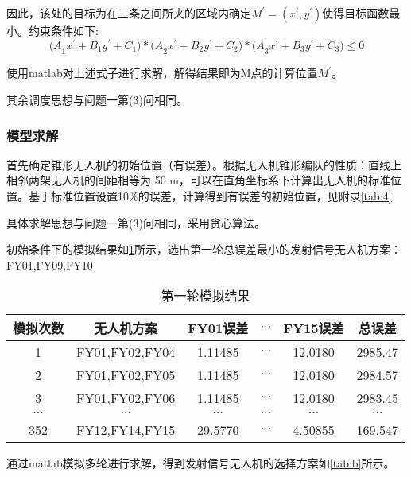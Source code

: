 \documentclass{cumcmthesis}
\begin{document}
因此，该处的目标为在三条之间所夹的区域内确定$M^\prime=(x^\prime,y^\prime)$使得目标函数最小。约束条件如下:
\begin{equation}
	{(A}_1x^\prime+B_1y^\prime+C_1)\ast{(A}_2x^\prime+B_2y^\prime+C_2)\ast{(A}_3x^\prime+B_3y^\prime+C_3)\le0
	\label{eq:34}
\end{equation}

使用matlab对上述式子进行求解，解得结果即为M点的计算位置$M^\prime$。

其余调度思想与问题一第(3)问相同。
\subsubsection{模型求解}

首先确定锥形无人机的初始位置（有误差）。根据无人机锥形编队的性质：直线上相邻两架无人机的间距相等为 50 m，可以在直角坐标系下计算出无人机的标准位置。基于标准位置设置10\%的误差，计算得到有误差的初始位置，见附录\cref{tab:4}

具体求解思想与问题一第(3)问相同，采用贪心算法。

初始条件下的模拟结果如\cref{tab:a}所示，选出第一轮总误差最小的发射信号无人机方案：FY01,FY09,FY10
\begin{table}[!htbp]
	\caption{第一轮模拟结果}\label{tab:a} \centering
	\begin{tabular}{cccccc}
		\toprule[1.5pt]
		模拟次数 & 无人机方案 & FY01误差 & $\cdots$ & FY15误差 & 总误差\\
		\midrule[1pt]
		1 & FY01,FY02,FY04 & 1.11485 & 	$\cdots$ & 12.0180 & 2985.47\\
		2 & FY01,FY02,FY05 & 1.11485 & 	$\cdots$ &12.0180&2984.57 \\
		3 & FY01,FY02,FY06 & 1.11485 & 	$\cdots$ &12.0180&2983.45\\
		$\cdots$ & $\cdots$ & $\cdots$ & $\cdots$ & $\cdots$ & $\cdots$\\
		352 & FY12,FY14,FY15 & 29.5770 & 	$\cdots$ & 4.50855& 169.547\\
		\bottomrule[1.5pt]
	\end{tabular}
\end{table}

通过matlab模拟多轮进行求解，得到发射信号无人机的选择方案如\cref{tab:b}所示。
	
\end{document}
